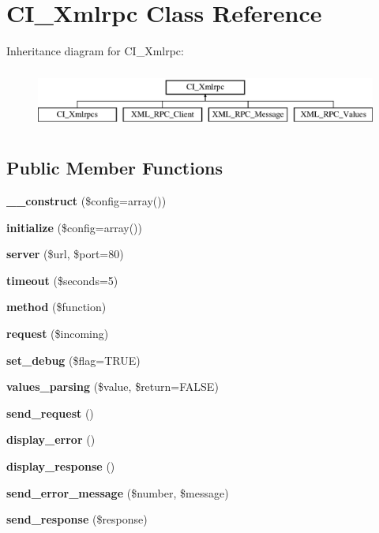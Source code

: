 \section{C\-I\-\_\-\-Xmlrpc Class Reference}
\label{class_c_i___xmlrpc}
Inheritance diagram for C\-I\-\_\-\-Xmlrpc\-:\begin{figure}[H]
\begin{center}
\leavevmode
\includegraphics[height=2.000000cm]{class_c_i___xmlrpc}
\end{center}
\end{figure}
\subsection*{Public Member Functions}
\begin{DoxyCompactItemize}
\item 
{\bf \-\_\-\-\_\-construct} (\$config=array())
\item 
{\bf initialize} (\$config=array())
\item 
{\bf server} (\$url, \$port=80)
\item 
{\bf timeout} (\$seconds=5)
\item 
{\bf method} (\$function)
\item 
{\bf request} (\$incoming)
\item 
{\bf set\-\_\-debug} (\$flag=T\-R\-U\-E)
\item 
{\bf values\-\_\-parsing} (\$value, \$return=F\-A\-L\-S\-E)
\item 
{\bf send\-\_\-request} ()
\item 
{\bf display\-\_\-error} ()
\item 
{\bf display\-\_\-response} ()
\item 
{\bf send\-\_\-error\-\_\-message} (\$number, \$message)
\item 
{\bf send\-\_\-response} (\$response)
\end{DoxyCompactItemize}
